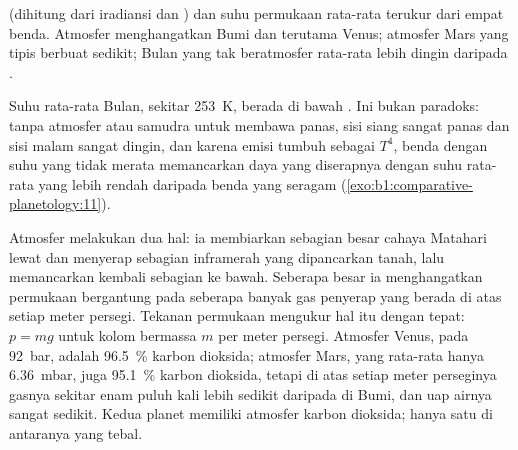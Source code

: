 \begin{omfigure}

{\small {} (dihitung dari iradiansi dan ) dan suhu permukaan rata-rata terukur dari empat benda. Atmosfer menghangatkan Bumi dan terutama Venus; atmosfer Mars yang tipis berbuat sedikit; Bulan yang tak beratmosfer rata-rata lebih dingin daripada .}
\end{omfigure}

Suhu rata-rata Bulan, sekitar \qty{253}{K}, berada di bawah . Ini bukan paradoks: tanpa atmosfer atau samudra untuk membawa panas, sisi siang sangat panas dan sisi malam sangat dingin, dan karena emisi tumbuh sebagai $T^4$, benda dengan suhu yang tidak merata memancarkan daya yang diserapnya dengan suhu rata-rata yang lebih rendah daripada benda yang seragam (\cref{exo:b1:comparative-planetology:11}).

Atmosfer melakukan dua hal: ia membiarkan sebagian besar cahaya Matahari lewat dan menyerap sebagian inframerah yang dipancarkan tanah, lalu memancarkan kembali sebagian ke bawah. Seberapa besar ia menghangatkan permukaan bergantung pada seberapa banyak gas penyerap yang berada di atas setiap meter persegi. Tekanan permukaan mengukur hal itu dengan tepat: $p = mg$ untuk kolom bermassa $m$ per meter persegi. Atmosfer Venus, pada \qty{92}{bar}, adalah \qty{96.5}{\percent} karbon dioksida; atmosfer Mars, yang rata-rata hanya \qty{6.36}{mbar}, juga \qty{95.1}{\percent} karbon dioksida, tetapi di atas setiap meter perseginya gasnya sekitar enam puluh kali lebih sedikit daripada di Bumi, dan uap airnya sangat sedikit. Kedua planet memiliki atmosfer karbon dioksida; hanya satu di antaranya yang tebal.

